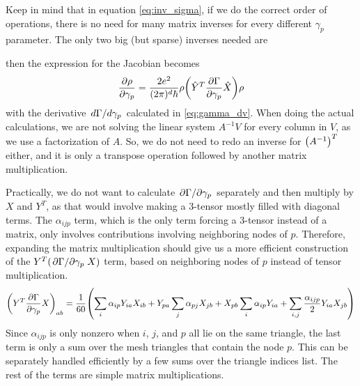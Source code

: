 \documentclass[12pt]{article}
\begin{document}
Keep in mind that in equation \eqref{eq:inv_sigma}, if we do the correct order of operations, there is no need for many matrix inverses for every different $\gamma_p$ parameter. The only two big (but sparse) inverses needed are
then the expression for the Jacobian becomes
\begin{equation}
    \pdv{\rho}{\gamma_p} = \frac{2e^2}{(2\pi)^d\hbar}
    \rho\qty(\hat{Y}^T\pdv{\Gamma}{\gamma_p}\hat{X})\rho
\end{equation}
with the derivative $\dv*{\Gamma}{\gamma_p}$ calculated in \eqref{eq:gamma_dv}. When doing the actual calculations, we are not solving the linear system $A^{-1}V$ for every column in $V$, as we use a factorization of $A$. So, we do not need to redo an inverse for $\qty(A^{-1})^T$ either, and it is only a transpose operation followed by another matrix multiplication.

Practically, we do not want to calculate $\pdv*{\Gamma}{\gamma_p}$ separately and then multiply by
$X$ and $Y^T$, as that would involve making a 3-tensor mostly filled with diagonal terms.
The $\alpha_{ijp}$ term, which is the only term forcing a 3-tensor instead of a matrix,
only involves contributions involving neighboring nodes of $p$. Therefore, expanding the matrix
multiplication should give us a more efficient construction of the $Y^T(\pdv*{\Gamma}{\gamma_p}X)$ term,
based on neighboring nodes of $p$ instead of tensor multiplication.
\begin{equation}
    \qty(Y^T\pdv{\Gamma}{\gamma_p}X)_{ab} = \frac{1}{60}\qty(
        \sum_i\alpha_{ip}Y_{ia}X_{ib}
        + Y_{pa}\sum_j\alpha_{pj}X_{jb}
        + X_{pb}\sum_i\alpha_{ip}Y_{ia}
        + \sum_{i,j}\frac{\alpha_{ijp}}{2}Y_{ia}X_{jb})
\end{equation}
Since $\alpha_{ijp}$ is only nonzero when $i$, $j$, and $p$ all lie on the same triangle,
the last term is only a sum over the mesh triangles that contain the node $p$.
This can be separately handled efficiently by a few sums over the triangle indices list.
The rest of the terms are simple matrix multiplications.
\end{document}
